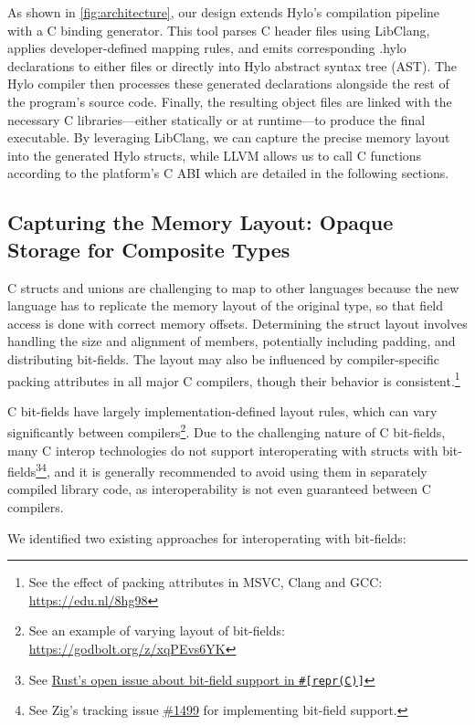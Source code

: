 As shown in \autoref{fig:architecture}, our design extends Hylo's compilation pipeline with a C binding generator. This tool parses C header files using LibClang, applies developer-defined mapping rules, and emits corresponding .hylo declarations to either files or directly into Hylo abstract syntax tree (AST). The Hylo compiler then processes these generated declarations alongside the rest of the program's source code. Finally, the resulting object files are linked with the necessary C libraries—either statically or at runtime—to produce the final executable. By leveraging LibClang, we can capture the precise memory layout into the generated Hylo structs, while LLVM allows us to call C functions according to the platform's C ABI which are detailed in the following sections.

\subsection{Capturing the Memory Layout: Opaque Storage for Composite Types}

C structs and unions are challenging to map to other languages because the new language has to replicate the memory layout of the original type, so that field access is done with correct memory offsets. Determining the struct layout involves handling the size and alignment of members, potentially including padding, and distributing bit-fields. The layout may also be influenced by compiler-specific packing attributes in all major C compilers, though their behavior is consistent.\footnote{See the effect of packing attributes in MSVC, Clang and GCC: \url{https://edu.nl/8hg98}}

C bit-fields have largely implementation-defined layout rules, which can vary significantly between compilers\footnote{See an example of varying layout of bit-fields: \url{https://godbolt.org/z/xqPEvs6YK}}. Due to the challenging nature of C bit-fields, many C interop technologies do not support interoperating with structs with bit-fields\footnote{See \href{https://github.com/rust-lang/rfcs/issues/314}{Rust's open issue about bit-field support in \texttt{\#[repr(C)]}}}\footnote{See Zig's tracking issue \href{https://github.com/ziglang/zig/issues/1499}{\#1499} for implementing bit-field support.}, and it is generally recommended to avoid using them in separately compiled library code, as interoperability is not even guaranteed between C compilers.

We identified two existing approaches for interoperating with bit-fields:

